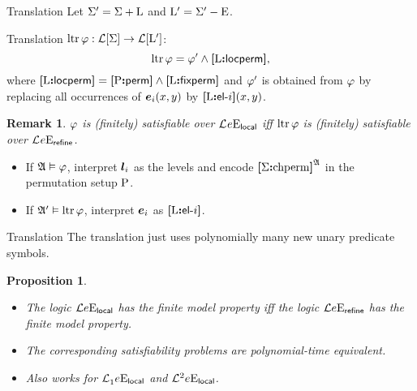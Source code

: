 \documentclass{beamer}
\newtheorem{remark}{Remark}
\newtheorem{proposition}{Proposition}
\begin{document}
\begin{frame}{Translation}
Let $\Sigma' = \Sigma + {\mathrm{L}}$ and ${\mathrm{L}}' = \Sigma' - {\mathrm{E}}$.

Translation $\operatorname{ltr}\varphi : \mathcal{L}[\Sigma] \to \mathcal{L}[{{\mathrm{L}}'}]$:
\[
  \operatorname{ltr}\varphi = {\varphi'} \land {\bm{[}{\mathrm{L}}\mathord{\bm{:}}\mathsf{locperm}\bm{]}},
\]
where
${\bm{[}{\mathrm{L}}\mathord{\bm{:}}\mathsf{locperm}\bm{]}} = {\bm{[}{\mathrm{P}}\mathord{\bm{:}}\mathsf{perm}\bm{]}} \land {\bm{[}{\mathrm{L}}\mathord{\bm{:}}\mathsf{fixperm}\bm{]}}$
and ${\varphi'}$ is obtained from $\varphi$ by replacing all occurrences
of $\bm{e}_{i}(x,y)$ by ${\bm{[}{\mathrm{L}}\mathord{\bm{:}}\mathsf{el}{\hbox{-}}i\bm{]}}(x,y)$.
\begin{remark}
$\varphi$ is (finitely) satisfiable over $\mathcal{L}^{{}}_{{}}{e}\mathrm{E}_{\mathsf{local}}$ iff
$\operatorname{ltr}\varphi$ is (finitely) satisfiable over
$\mathcal{L}^{{}}_{{}}{e}\mathrm{E}_{\mathsf{refine}}$.
\end{remark}
\begin{itemize}
  \item If $\mathfrak{A}\vDash\varphi$, interpret $\bm{l}_{i}$ as the levels and encode
  ${\bm{[}\Sigma\mathord{\bm{:}}\mathrm{chperm}\bm{]}}^{\mathfrak{A}}$ in the permutation setup ${\mathrm{P}}$.
  \item If $\mathfrak{A'}\vDash\operatorname{ltr}\varphi$, interpret $\bm{e}_{i}$ as ${\bm{[}{\mathrm{L}}\mathord{\bm{:}}\mathsf{el}{\hbox{-}}i\bm{]}}$.
\end{itemize}
\end{frame}

\begin{frame}{Translation}
The translation just uses polynomially many new unary predicate symbols.
\begin{proposition}
\begin{itemize}
  \item The logic $\mathcal{L}{e}\mathrm{E}_{\mathsf{local}}$ has the finite model property iff
  the logic $\mathcal{L}{e}\mathrm{E}_{\mathsf{refine}}$ has the finite model property.
  \item The corresponding satisfiability problems are polynomial-time
  equivalent.
  \item Also works for $\mathcal{L}^{{}}_{1}{e}\mathrm{E}_{\mathsf{local}}$ and
  $\mathcal{L}^{2}_{{}}{e}\mathrm{E}_{\mathsf{local}}$.
\end{itemize}
\end{proposition}
\end{frame}
\end{document}
